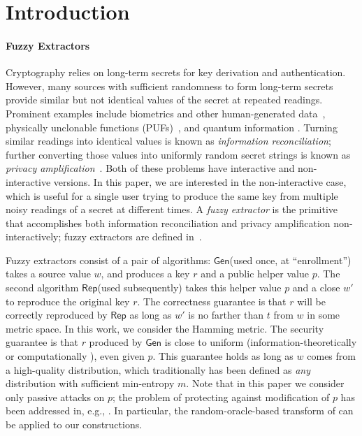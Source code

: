\documentclass[11pt]{article}
\newcommand{\class}[1]{{\ensuremath{\mathsf{#1}}}}
\newcommand{\gen}{\ensuremath{\class{Gen}}\xspace}
\newcommand{\rep}{\ensuremath{\class{Rep}}\xspace}
\begin{document}
\section{Introduction}\label{sec:introduction}

\paragraph{Fuzzy Extractors}
Cryptography relies on long-term secrets for key derivation and authentication. However, many sources with sufficient randomness to form long-term secrets provide similar but not identical values of the secret at repeated readings. Prominent examples include biometrics and other human-generated data~\cite{daugman2004,zviran1993comparison,brostoff2000passfaces,ellison2000protecting,mayrhofer2009shake,monrose2002password},
physically unclonable functions (PUFs)~\cite{pappu2002physical,tuyls2006puf,gassend2002silicon,suh2007physical},
and quantum information \cite{bennett1988privacy}. Turning similar readings into identical values is known as \emph{information reconciliation}; further converting those values into uniformly random secret strings is known as \emph{privacy amplification}~\cite{bennett1988privacy}.
Both of these problems have interactive and non-interactive versions.  In this paper, we are interested in the non-interactive case, which is useful for a single user trying to produce the same key from multiple noisy readings of a secret at different times.
 A \emph{fuzzy extractor} is the primitive that accomplishes both information reconciliation and privacy amplification non-interactively; fuzzy extractors are defined in~\cite{DBLP:journals/siamcomp/DodisORS08}.


Fuzzy extractors consist of a pair of algorithms: \gen (used once, at ``enrollment'') takes a source value $w$, and produces a key $r$ and a public helper value $p$.  The second algorithm \rep (used subsequently) takes this helper value $p$ and a close $w'$ to reproduce the original key $r$.
The correctness guarantee is that $r$ will be correctly reproduced by \rep as long as $w'$ is no farther than $t$ from $w$ in some metric space. In this work, we consider the Hamming metric.
 The security guarantee is that $r$ produced by \gen is close to uniform (information-theoretically \cite{DBLP:journals/siamcomp/DodisORS08} or computationally \cite{fuller2013computational}), even given $p$. This guarantee holds as long as $w$ comes from a high-quality distribution, which
traditionally has been defined as \emph{any} distribution with sufficient min-entropy $m$. Note that in this paper we consider only passive attacks on $p$; the problem of protecting against modification of $p$ has been addressed in, e.g., \cite{Boyen05secureremote,DKKRS12}.  In particular, the random-oracle-based transform of \cite[Theorem 1]{Boyen05secureremote} can be applied to our constructions.
\end{document}
